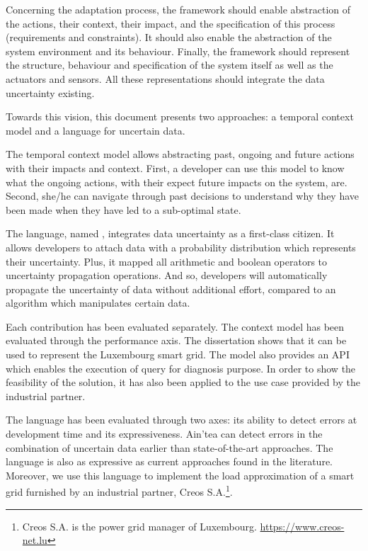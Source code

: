 Concerning the adaptation process, the framework should enable abstraction of the actions, their context, their impact, and the specification of this process (requirements and constraints).
It should also enable the abstraction of the system environment and its behaviour.
Finally, the framework should represent the structure, behaviour and specification of the system itself as well as the actuators and sensors.
All these representations should integrate the data uncertainty existing.

\bigskip
{}
Towards this vision, this document presents two approaches: a temporal context model and a language for uncertain data.

The temporal context model allows abstracting past, ongoing and future actions with their impacts and context.
First, a developer can use this model to know what the ongoing actions, with their expect future impacts on the system, are.
Second, she/he can navigate through past decisions to understand why they have been made when they have led to a sub-optimal state.

The language, named \langName, integrates data uncertainty as a first-class citizen.
It allows developers to attach data with a probability distribution which represents their uncertainty.
Plus, it mapped all arithmetic and boolean operators to uncertainty propagation operations. 
And so, developers will automatically propagate the uncertainty of data without additional effort, compared to an algorithm which manipulates certain data.

\bigskip
{}
Each contribution has been evaluated separately. 
The context model has been evaluated through the performance axis.
The dissertation shows that it can be used to represent the Luxembourg smart grid.
The model also provides an API which enables the execution of query for diagnosis purpose.
In order to show the feasibility of the solution, it has also been applied to the use case provided by the industrial partner.

The language has been evaluated through two axes: its ability to detect errors at development time and its expressiveness.
Ain'tea can detect errors in the combination of uncertain data earlier than state-of-the-art approaches.
The language is also as expressive as current approaches found in the literature.
Moreover, we use this language to implement the load approximation of a smart grid furnished by an industrial partner, Creos S.A.\footnote{Creos S.A. is the power grid manager of Luxembourg. \url{https://www.creos-net.lu}}.

\bigskip
\bigskip
\bigskip
{}


